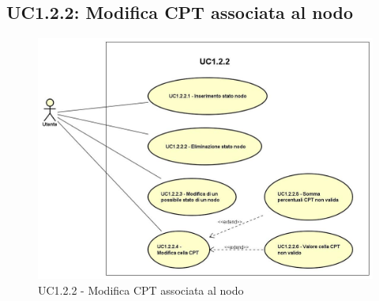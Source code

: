 \subsection{UC1.2.2: Modifica CPT associata al nodo} 
\hypertarget{UC1.2.2}{} 
\begin{figure} [H]
	\centering
	\includegraphics[scale=0.45]{Img/UC1-2-2} 
	\caption{UC1.2.2 - Modifica CPT associata al nodo} \label{} 
\end{figure} 
